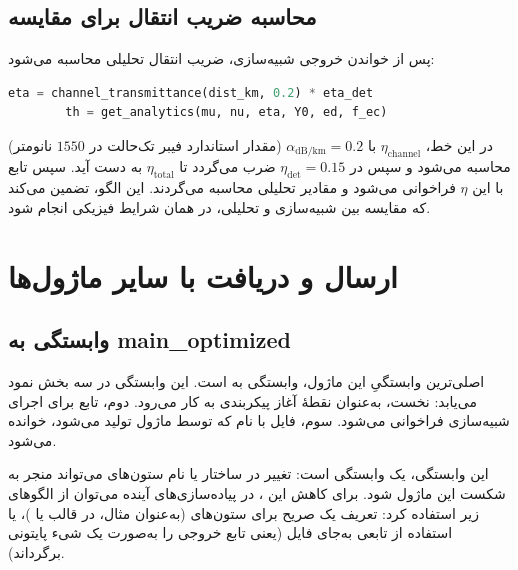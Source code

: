 \subsection{محاسبه ضریب انتقال برای مقایسه}

پس از خواندن خروجی شبیه‌سازی، ضریب انتقال تحلیلی محاسبه می‌شود:

\begin{LTR}
	\begin{lstlisting}[language=Python]
		eta = channel_transmittance(dist_km, 0.2) * eta_det
		th = get_analytics(mu, nu, eta, Y0, ed, f_ec)
	\end{lstlisting}
\end{LTR}

در این خط، $\eta_{\text{channel}}$ با $\alpha_{\text{dB/km}} = 0.2$ (مقدار استاندارد فیبر تک‌حالت در $1550$ نانومتر) محاسبه می‌شود و سپس در $\eta_{\text{det}} = 0.15$ ضرب می‌گردد تا $\eta_{\text{total}}$ به دست آید. سپس تابع  با این $\eta$ فراخوانی می‌شود و مقادیر تحلیلی محاسبه می‌گردند. این الگو، تضمین می‌کند که مقایسه بین شبیه‌سازی و تحلیلی، در همان شرایط فیزیکی انجام شود.

\section{ارسال و دریافت با سایر ماژول‌ها}

\subsection{وابستگی به main\_optimized}

اصلی‌ترین وابستگیِ این ماژول، وابستگی به  است. این وابستگی در سه بخش نمود می‌یابد: نخست،  به‌عنوان نقطهٔ آغاز پیکربندی به کار می‌رود. دوم، تابع  برای اجرای شبیه‌سازی فراخوانی می‌شود. سوم، فایل  با نام  که توسط ماژول  تولید می‌شود، خوانده می‌شود.

این وابستگی، یک وابستگی  است: تغییر در ساختار  یا نام ستون‌های  می‌تواند منجر به شکست این ماژول شود. برای کاهش این ، در پیاده‌سازی‌های آینده می‌توان از الگوهای زیر استفاده کرد: تعریف یک  صریح برای ستون‌های  (به‌عنوان مثال، در قالب  یا )، یا استفاده از  تابعی به‌جای فایل  (یعنی تابع  خروجی را به‌صورت یک شیء پایتونی برگرداند).

